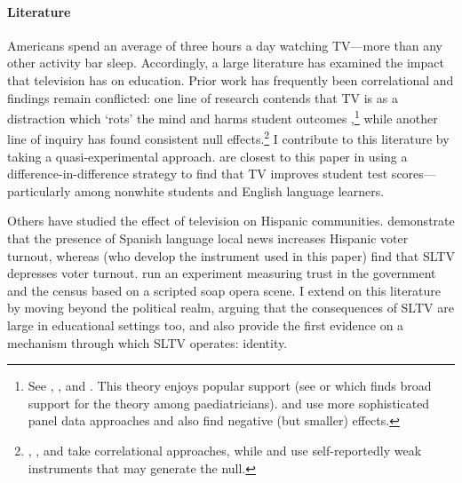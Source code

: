 \documentclass[11pt]{article}
\begin{document}
\paragraph{Literature} Americans spend an average of three hours a day watching TV---more than any other activity bar sleep. Accordingly, a large literature has examined the impact that television has on education. Prior work has frequently been correlational and findings remain conflicted: one line of research contends that TV is as a distraction which `rots' the mind and harms student outcomes \citep{zavodny_does_2006},\footnote{ See \cite{aksoy2000panel}, \cite{hornik1981out}, and \cite{keith1986parental}. This theory enjoys popular support (see \cite{winn_plug-drug_2002} or \cite{gentile_well-child_2004} which finds broad support for the theory among paediatricians). \cite{huang2010dynamic} and \cite{nakamuro2015television} use more sophisticated panel data approaches and also find negative (but smaller) effects.} while another line of inquiry has found consistent null effects.\footnote{ \cite{gaddy1986television}, \cite{gortmaker1990impact}, and \cite{hu2020relationship} take correlational approaches, while \cite{munasib2010idiot} and \cite{kureishi2013does} use self-reportedly weak instruments that may generate the null.} I contribute to this literature by taking a quasi-experimental approach. \cite{gentzkow_preschool_2008} are closest to this paper in using a difference-in-difference strategy to find that TV improves student test scores---particularly among nonwhite students and English language learners. 

Others have studied the effect of television on Hispanic communities. \cite{oberholzer-gee_media_2009} demonstrate that the presence of Spanish language local news increases Hispanic voter turnout, whereas  \cite{velez_tuning_2019} (who develop the instrument used in this paper) find that SLTV depresses voter turnout. \cite{trujillo_devil_2012} run an experiment measuring trust in the government and the census based on a scripted soap opera scene. I extend on this literature by moving beyond the political realm, arguing that the consequences of SLTV are large in educational settings too, and also provide the first evidence on a mechanism through which SLTV operates: identity.
\end{document}
